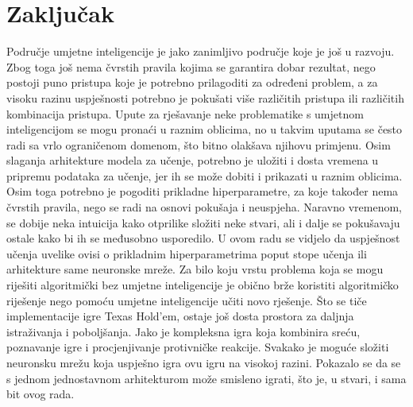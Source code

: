 \section{Zaključak}
Područje umjetne inteligencije je jako zanimljivo područje koje je još u razvoju. Zbog toga još nema čvrstih pravila kojima se garantira dobar rezultat, nego postoji puno pristupa koje je potrebno prilagoditi za određeni problem, a za visoku razinu uspješnosti potrebno je pokušati više različitih pristupa ili različitih kombinacija pristupa. Upute za rješavanje neke problematike s umjetnom inteligencijom se mogu pronaći u raznim oblicima, no u takvim uputama se često radi sa vrlo ograničenom domenom, što bitno olakšava njihovu primjenu. Osim slaganja arhitekture modela za učenje, potrebno je uložiti i dosta vremena u pripremu podataka za učenje, jer ih se može dobiti i prikazati u raznim oblicima. Osim toga potrebno je pogoditi prikladne hiperparametre, za koje također nema čvrstih pravila, nego se radi na osnovi pokušaja i neuspjeha. Naravno vremenom, se dobije neka intuicija kako otprilike složiti neke stvari, ali i dalje se pokušavaju ostale kako bi ih se međusobno usporedilo. U ovom radu se vidjelo da uspješnost učenja uvelike ovisi o prikladnim hiperparametrima poput stope učenja ili arhitekture same neuronske mreže. Za bilo koju vrstu problema koja se mogu riješiti algoritmički bez umjetne inteligencije je obično brže koristiti algoritmičko riješenje nego pomoću umjetne inteligencije učiti novo rješenje. Što se tiče implementacije igre Texas Hold’em, ostaje još dosta prostora za daljnja istraživanja i poboljšanja. Jako je kompleksna igra koja kombinira sreću, poznavanje igre i procjenjivanje protivničke reakcije. Svakako je moguće složiti neuronsku mrežu koja uspješno igra ovu igru na visokoj razini. Pokazalo se da se s jednom jednostavnom arhitekturom može smisleno igrati, što je, u stvari, i sama bit ovog rada.